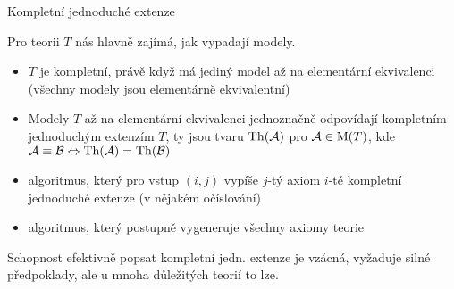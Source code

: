 \documentclass{beamer}
\begin{document}
\begin{frame}{Kompletní jednoduché extenze}

    \vspace{-6pt}

    Pro teorii $T$ nás hlavně zajímá, jak vypadají modely.

    \vspace{-6pt}
    \begin{itemize}
        \item $T$ je \alert{kompletní}, právě když má jediný model až na elementární ekvivalenci (všechny modely jsou elementárně ekvivalentní)
        \item Modely $T$ až na elementární ekvivalenci jednoznačně odpovídají \alert{kompletním jednoduchým extenzím} $T$, ty jsou tvaru $\operatorname{Th}(\mathcal{A})$ pro $\mathcal{A}\in\operatorname{M}(T)$, kde $\mathcal{A}\equiv\mathcal{B}\Leftrightarrow\operatorname{Th}(\mathcal{A})=\operatorname{Th}(\mathcal{B})$
    \end{itemize}
    

    
    \begin{itemize}
        \item algoritmus, který pro vstup $(i,j)$ vypíše $j$-tý axiom $i$-té kompletní jednoduché extenze (v nějakém očíslování)
        \item algoritmus, který postupně vygeneruje všechny axiomy teorie
    \end{itemize}

    Schopnost efektivně popsat kompletní jedn. extenze je vzácná, vyžaduje silné předpoklady, ale u mnoha důležitých teorií to lze. 

\end{frame}
\end{document}
